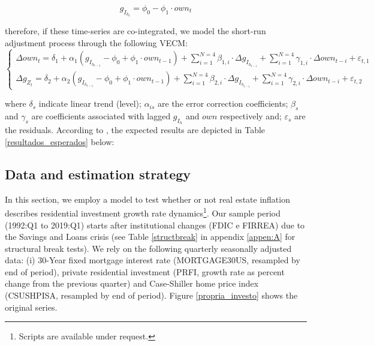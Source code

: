 \documentclass[12pt, a4]{article}
\begin{document}
\begin{equation}
g_{I_{h_{t}}} = \phi_0 - \phi_1\cdot own_t
\end{equation}

therefore, if these time-series are co-integrated, we model the short-run adjustment process through the following VECM:
\begin{equation}
\begin{cases}
\Delta own_t = \delta_{1} + \alpha_1\left(g_{I_{h_{t-1}}} - \phi_0 + \phi_1\cdot own_{t-1}\right) + {\sum^{N=4}_{i=1}}\beta_{1,i}\cdot \Delta g_{I_{h_{t-i}}} +
\sum^{N=4}_{i=1}\gamma_{1,i}\cdot \Delta own_{t-i} +\varepsilon_{t,1}
\\
\Delta g_{Z_{t}} = \delta_{2} + \alpha_2\left(g_{I_{h_{t-1}}} - \phi_0 + \phi_1\cdot own_{t-1}\right) + \sum^{N=4}_{i=1}\beta_{2,i}\cdot \Delta g_{I_{h_{t-i}}} +
\sum^{N=4}_{i=1}\gamma_{2,i}\cdot \Delta own_{t-i} +\varepsilon_{t,2}
\end{cases}
\end{equation}

where \(\delta_s\) indicate linear trend (level);
\(\alpha_{is}\) are the error correction coefficients; 
\(\beta_s\) and \(\gamma_s\) are coefficients associated with lagged \(g_{I_h}\) and \(own\) respectively and; \(\varepsilon_s\) are the residuals.
According to \textcite{teixeira_crescimento_2015}, the expected results are depicted in Table \ref{resultados_esperados} below:



\subsection{Data and estimation strategy}
\label{sec:org237d895}
\label{sec:estimation}


In this section, we employ a model to test whether or not real estate inflation describes residential investment growth rate dynamics\footnote{Scripts are available under request.}.
Our sample period (1992:Q1 to 2019:Q1) starts after institutional changes (FDIC e
FIRREA) due to the Savings and Loans crisis (see Table \ref{structbreak} in appendix \ref{appen:A} for structural break tests).
We rely on the following  quarterly seasonally adjusted data: (i) 30-Year fixed mortgage interest rate (MORTGAGE30US, resampled by end of period), private residential investment (PRFI, growth rate as percent change from the previous quarter) and Case-Shiller home price index
(CSUSHPISA, resampled by end of period). Figure \ref{propria_investo}  shows the original series.
\end{document}
